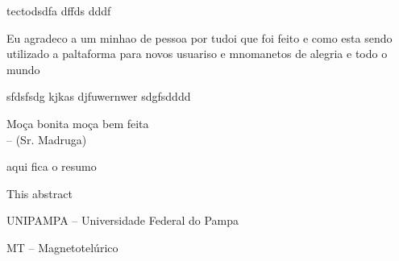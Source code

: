 \documentclass[12pt,twoside,oneright,a4paper,chapter=TITLE,english,brazil]{unipampa}
\begin{document}
\imprimircapa                   %

\imprimirfolhaderosto*          %

\imprimirfichacatalografica     %

\imprimirfolhadeaprovacao       %


\begin{dedicatoria}
    tectodsdfa dffds dddf
\end{dedicatoria}


\begin{agradecimentos}
    Eu agradeco a um minhao de pessoa por tudoi que foi feito e como esta sendo utilizado a paltaforma para novos usuariso e mnomanetos de alegria e todo o mundo
    
    \noindent sfdsfsdg kjkas djfuwernwer sdgfsdddd
\end{agradecimentos}


\begin{epigrafe}
    Moça bonita moça bem feita
    \DoubleSpacing \\
    -- (Sr. Madruga)
\end{epigrafe}


\begin{resumo}
 aqui fica o resumo
\end{resumo}


\begin{resumoingles}
 This abstract
\end{resumoingles}


\listoffigures      %
\listoftables       %


\begin{siglas}
    \item[UNIPAMPA --]         Universidade Federal do Pampa
    \item[MT --]               Magnetotelúrico
\end{siglas}
\end{document}
